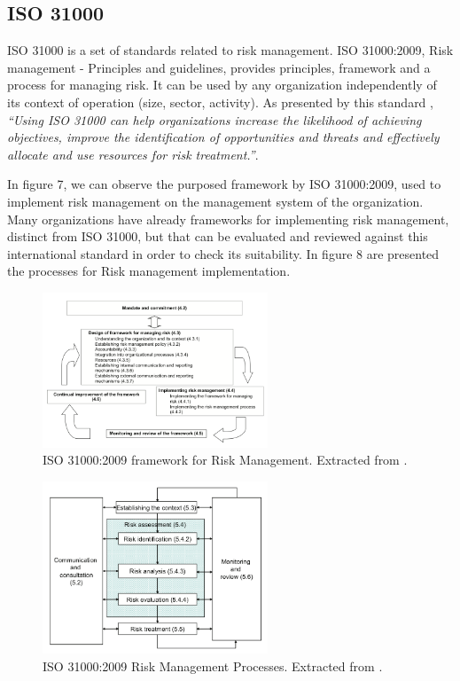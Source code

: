 \subsection{ISO 31000}

ISO 31000 is a set of standards related to risk management. ISO 31000:2009, Risk management - Principles and guidelines, provides principles, framework and a process for managing risk. It can be used by any organization independently of its context of operation (size, sector, activity). As presented by this standard \cite{ISO31000}, \textit{``Using ISO 31000 can help organizations increase the likelihood of achieving objectives, improve the identification of opportunities and threats and effectively allocate and use resources for risk treatment.''}.\par
In figure 7, we can observe the purposed framework by ISO 31000:2009, used to implement risk management on the management system of the organization. Many organizations have already frameworks for implementing risk management, distinct from ISO 31000, but that can be evaluated and reviewed against this international standard in order to check its suitability. In figure 8 are presented the processes for Risk management implementation.\par

\begin{figure}[h!]
\centering
\includegraphics[width=0.6\textwidth]{img/ISO31000Framework.png}
\caption{ISO 31000:2009 framework for Risk Management. Extracted from \cite{ISO31000}.}
\end{figure}

\begin{figure}[h!]
\centering
\includegraphics[width=0.6\textwidth]{img/ISO31000RiskProcesses.png}
\caption{ISO 31000:2009 Risk Management Processes. Extracted from \cite{ISO31000}.}
\end{figure}

